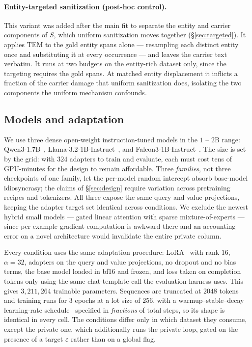 \paragraph{Entity-targeted sanitization (post-hoc control).}
This variant was added after the main fit to separate the entity and carrier components of $S$, which uniform sanitization moves together (\S\ref{sec:targeted}).
It applies TEM to the gold entity spans alone --- resampling each distinct entity once and substituting it at every occurrence --- and leaves the carrier text verbatim.
It runs at two budgets on the entity-rich dataset only, since the targeting requires the gold spans.
At matched entity displacement it inflicts a fraction of the carrier damage that uniform sanitization does, isolating the two components the uniform mechanism confounds.

\subsection{Models and adaptation}
We use three dense open-weight instruction-tuned models in the $1$ -- $2$B range:
Qwen3-1.7B~\citep{yang2025qwen3},
Llama-3.2-1B-Instruct~\citep{grattafiori2024llama},
and Falcon3-1B-Instruct~\citep{falcon3}.
The size is set by the grid: with $324$ adapters to train and evaluate, each must cost tens of GPU-minutes for the design to remain affordable.
Three \textit{families}, not three checkpoints of one family, let the per-model random intercept absorb base-model idiosyncrasy; the claims of \S\ref{sec:design} require variation across pretraining recipes and tokenizers.
All three expose the same query and value projections, keeping the adapter target set identical across conditions.
We exclude the newest hybrid small models --- gated linear attention with sparse mixture-of-experts --- since per-example gradient computation is awkward there and an accounting error on a novel architecture would invalidate the entire private column.

Every condition uses the same adaptation procedure:
LoRA~\citep{hu2022lora} with rank $16$,
$\alpha = 32$,
adapters on the query and value projections,
no dropout and no bias terms,
the base model loaded in bf16 and frozen,
and loss taken on completion tokens only using the same chat-template call the evaluation harness uses.
This gives $3{,}211{,}264$ trainable parameters.
Sequences are truncated at $2048$ tokens and training runs for $3$ epochs at a lot size of $256$,
with a warmup--stable--decay learning-rate schedule~\citep{hu2024minicpm} specified in \textit{fractions} of total steps,
so its shape is identical in every cell.
The conditions differ only in which dataset they consume,
except the private one,
which additionally runs the private loop,
gated on the presence of a target $\varepsilon$ rather than on a global flag.


